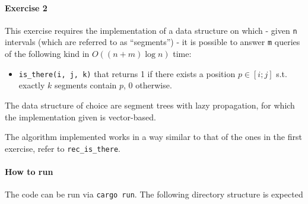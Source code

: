 \documentclass[12pt]{report}
\theoremstyle{definition}
\theoremstyle{definition}
\begin{document}
\paragraph*{Exercise 2}
This exercise requires the implementation of a data structure on which - given
\texttt{n} intervals (which are referred to as ``segments'') - it is possible
to answer \texttt{m} queries of the following kind in \(O((n+m)\log n)\) time:
\begin{itemize}
	\item \texttt{is\_there(i, j, k)} that returns 1 if there exists a position
	\(p \in [i; j]\) s.t. exactly \(k\) segments contain \(p\), 0 otherwise.
\end{itemize}

The data structure of choice are segment trees with lazy propagation, for which
the implementation given is vector-based.

The algorithm implemented works in a way similar to that of the ones in the first
exercise, refer to \texttt{rec\_is\_there}.

\paragraph*{How to run}
The code can be run via \texttt{cargo run}. The following directory structure is
expected
\end{document}

